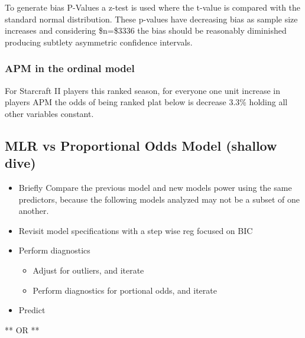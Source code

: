 \documentclass[]{article}
\newenvironment{Shaded}{\begin{snugshade}}{\end{snugshade}}
\newcommand{\CommentTok}[1]{\textcolor[rgb]{0.56,0.35,0.01}{\textit{#1}}}
\providecommand{\tightlist}{%
  \setlength{\itemsep}{0pt}\setlength{\parskip}{0pt}}
\begin{document}
To generate bias P-Values a z-test is used where the t-value is compared
with the standard normal distribution. These p-values have decreasing
bias as sample size increases and considering \$n=\$3336 the bias should
be reasonably diminished producing subtlety asymmetric confidence
intervals.

\hypertarget{apm-in-the-ordinal-model}{%
\subsubsection{APM in the ordinal
model}\label{apm-in-the-ordinal-model}}

For Starcraft II players this ranked season, for everyone one unit
increase in players APM the odds of being ranked plat below is decrease
3.3\% holding all other variables constant.

\begin{Shaded}
\end{Shaded}

\hypertarget{mlr-vs-proportional-odds-model-shallow-dive}{%
\subsection{MLR vs Proportional Odds Model (shallow
dive)}\label{mlr-vs-proportional-odds-model-shallow-dive}}

\begin{itemize}
\tightlist
\item
  Briefly Compare the previous model and new models power using the same
  predictors, because the following models analyzed may not be a subset
  of one another.
\item
  Revisit model specifications with a step wise reg focused on BIC
\item
  Perform diagnostics

  \begin{itemize}
  \tightlist
  \item
    Adjust for outliers, and iterate
  \item
    Perform diagnostics for portional odds, and iterate
  \end{itemize}
\item
  Predict
\end{itemize}

** OR **
\end{document}
